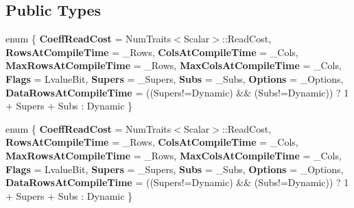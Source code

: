 \subsection*{Public Types}
\begin{DoxyCompactItemize}
\item 
\mbox{\label{struct_eigen_1_1internal_1_1traits_3_01_band_matrix_3_01___scalar_00_01___rows_00_01___cols_00_03762db5085b3b9896d5a124beda4837b_a71e42dbbffe73d7c99d5581b8ba10093}} 
enum \{ \newline
{\bfseries Coeff\+Read\+Cost} = Num\+Traits$<$Scalar$>$\+:\+:Read\+Cost, 
{\bfseries Rows\+At\+Compile\+Time} = \+\_\+\+Rows, 
{\bfseries Cols\+At\+Compile\+Time} = \+\_\+\+Cols, 
{\bfseries Max\+Rows\+At\+Compile\+Time} = \+\_\+\+Rows, 
\newline
{\bfseries Max\+Cols\+At\+Compile\+Time} = \+\_\+\+Cols, 
{\bfseries Flags} = Lvalue\+Bit, 
{\bfseries Supers} = \+\_\+\+Supers, 
{\bfseries Subs} = \+\_\+\+Subs, 
\newline
{\bfseries Options} = \+\_\+\+Options, 
{\bfseries Data\+Rows\+At\+Compile\+Time} = ((Supers!=Dynamic) \&\& (Subs!=Dynamic)) ? 1 + Supers + Subs \+: Dynamic
 \}
\item 
\mbox{\label{struct_eigen_1_1internal_1_1traits_3_01_band_matrix_3_01___scalar_00_01___rows_00_01___cols_00_03762db5085b3b9896d5a124beda4837b_ae7b531076e7fac16c6791ab5443ef012}} 
enum \{ \newline
{\bfseries Coeff\+Read\+Cost} = Num\+Traits$<$Scalar$>$\+:\+:Read\+Cost, 
{\bfseries Rows\+At\+Compile\+Time} = \+\_\+\+Rows, 
{\bfseries Cols\+At\+Compile\+Time} = \+\_\+\+Cols, 
{\bfseries Max\+Rows\+At\+Compile\+Time} = \+\_\+\+Rows, 
\newline
{\bfseries Max\+Cols\+At\+Compile\+Time} = \+\_\+\+Cols, 
{\bfseries Flags} = Lvalue\+Bit, 
{\bfseries Supers} = \+\_\+\+Supers, 
{\bfseries Subs} = \+\_\+\+Subs, 
\newline
{\bfseries Options} = \+\_\+\+Options, 
{\bfseries Data\+Rows\+At\+Compile\+Time} = ((Supers!=Dynamic) \&\& (Subs!=Dynamic)) ? 1 + Supers + Subs \+: Dynamic
 \}
\item 
\mbox{\label{struct_eigen_1_1internal_1_1traits_3_01_band_matrix_3_01___scalar_00_01___rows_00_01___cols_00_03762db5085b3b9896d5a124beda4837b_a7491ccd4fec074ebedf02909f324b36a}} 

\end{DoxyCompactItemize}
